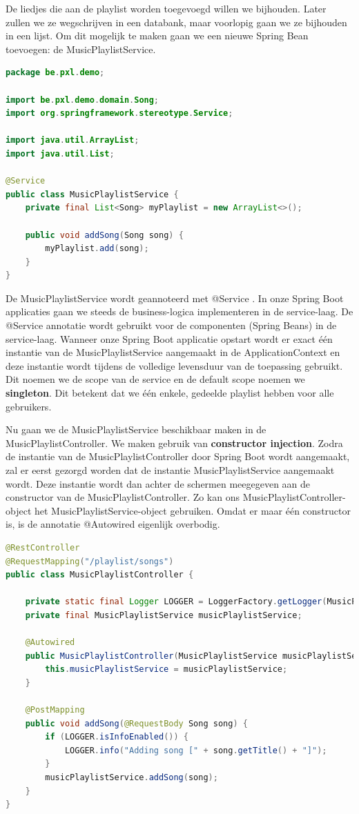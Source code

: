 De liedjes die aan de playlist worden toegevoegd willen we bijhouden. Later zullen we ze wegschrijven in een databank, maar voorlopig gaan we ze bijhouden in een lijst.
Om dit mogelijk te maken gaan we een nieuwe Spring Bean toevoegen: de MusicPlaylistService.  

\begin{lstlisting}[language=java,  frame=single]
package be.pxl.demo;

import be.pxl.demo.domain.Song;
import org.springframework.stereotype.Service;

import java.util.ArrayList;
import java.util.List;

@Service
public class MusicPlaylistService {
	private final List<Song> myPlaylist = new ArrayList<>();

	public void addSong(Song song) {
		myPlaylist.add(song);
	}
}
\end{lstlisting}

De MusicPlaylistService wordt geannoteerd met @Service .
In onze Spring Boot applicaties gaan we steeds de business-logica implementeren in de service-laag.  De @Service annotatie wordt gebruikt voor de componenten (Spring Beans) in de service-laag.  Wanneer onze Spring Boot applicatie opstart wordt er exact \'e\'en instantie van de MusicPlaylistService aangemaakt in de ApplicationContext en deze instantie wordt tijdens de volledige levensduur van de toepassing gebruikt.  Dit noemen we de scope van de service en de default scope noemen we \textbf{singleton}. 
Dit betekent dat we \'e\'en enkele, gedeelde playlist hebben voor alle gebruikers.

Nu gaan we de MusicPlaylistService beschikbaar maken in de MusicPlaylistController.
We maken gebruik van \textbf{constructor injection}.  Zodra de instantie van de MusicPlaylistController door Spring Boot wordt aangemaakt, zal er eerst gezorgd worden dat de instantie MusicPlaylistService aangemaakt wordt. Deze instantie wordt dan achter de schermen meegegeven aan de constructor van de MusicPlaylistController. Zo kan ons MusicPlaylistController-object het MusicPlaylistService-object gebruiken.
Omdat er maar \'e\'en constructor is, is de annotatie @Autowired eigenlijk overbodig.

\begin{lstlisting}[language=java,  frame=single]
@RestController
@RequestMapping("/playlist/songs")
public class MusicPlaylistController {

	private static final Logger LOGGER = LoggerFactory.getLogger(MusicPlaylistController.class);
	private final MusicPlaylistService musicPlaylistService;

	@Autowired
	public MusicPlaylistController(MusicPlaylistService musicPlaylistService) {
		this.musicPlaylistService = musicPlaylistService;
	}

	@PostMapping
	public void addSong(@RequestBody Song song) {
		if (LOGGER.isInfoEnabled()) {
			LOGGER.info("Adding song [" + song.getTitle() + "]");
		}
		musicPlaylistService.addSong(song);
	}
}
\end{lstlisting}

